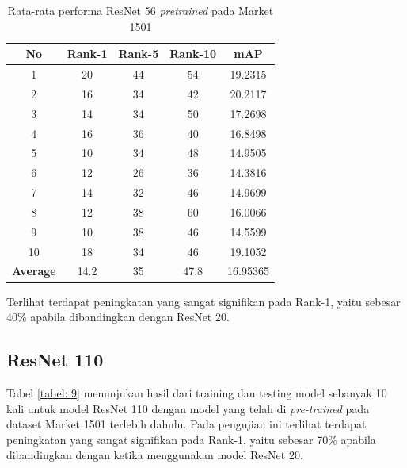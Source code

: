 \begin{longtable}{|c|c|c|c|c|}
	\caption{Rata-rata performa ResNet 56 \textit{pretrained} pada Market 1501 }
	\label{tabel: 8}\\
	\hline
	\rowcolor[HTML]{C0C0C0}
	\textbf{No} &\textbf{Rank-1} & \textbf{Rank-5} & \textbf{Rank-10} & \textbf{mAP} \\
	\hline
	1 & 20 & 44 & 54 & 19.2315\\
	2 & 16 & 34 & 42 & 20.2117\\
	3 & 14 & 34 & 50 & 17.2698\\
	4 & 16 & 36 & 40 & 16.8498\\
	5 & 10 & 34 & 48 & 14.9505\\
	6 & 12 & 26 & 36 & 14.3816\\
	7 & 14 & 32 & 46 & 14.9699\\
	8 & 12 & 38 & 60 & 16.0066\\
	9 & 10 & 38 & 46 & 14.5599\\
	10 & 18 & 34 & 46 & 19.1052\\
	\hline
	\textbf{Average} & 14.2 & 35 & 47.8 & 16.95365\\
	\hline
\end{longtable}

Terlihat terdapat peningkatan yang sangat signifikan pada Rank-1, yaitu sebesar 40\% apabila dibandingkan dengan ResNet 20.

\subsection{ResNet 110}

Tabel \ref{tabel: 9} menunjukan hasil dari training dan testing model sebanyak 10 kali untuk model ResNet 110 dengan model yang telah di \textit{pre-trained} pada dataset Market 1501 terlebih dahulu. Pada pengujian ini terlihat terdapat peningkatan yang sangat signifikan pada Rank-1, yaitu sebesar 70\% apabila dibandingkan dengan ketika menggunakan model ResNet 20.

\vspace{1ex}

